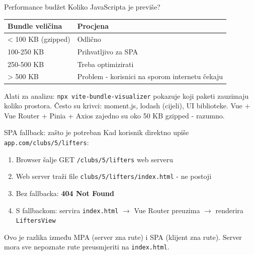 \begin{frame}{Performance budžet}
Koliko JavaScripta je previše?

\vspace{0.4em}
\begin{tabular}{@{}ll@{}}
  \toprule
  \textbf{Bundle veličina} & \textbf{Procjena} \\
  \midrule
  < 100 KB (gzipped) & Odlično \\
  100-250 KB & Prihvatljivo za SPA \\
  250-500 KB & Treba optimizirati \\
  > 500 KB & Problem - korisnici na sporom internetu čekaju \\
  \bottomrule
\end{tabular}

\vspace{0.6em}
Alati za analizu: \texttt{npx vite-bundle-visualizer} pokazuje koji paketi zauzimaju koliko prostora. Često su krivci: moment.js, lodash (cijeli), UI biblioteke. Vue + Vue Router + Pinia + Axios zajedno su oko 50 KB gzipped - razumno.
\end{frame}

\begin{frame}{SPA fallback: zašto je potreban}
Kad korisnik direktno upiše \texttt{app.com/clubs/5/lifters}:

\vspace{0.4em}
\begin{enumerate}
  \item Browser šalje GET \texttt{/clubs/5/lifters} web serveru
  \item Web server traži file \texttt{clubs/5/lifters/index.html} - ne postoji
  \item Bez fallbacka: \textbf{404 Not Found}
  \item S fallbackom: servira \texttt{index.html} $\rightarrow$ Vue Router preuzima $\rightarrow$ renderira \texttt{LiftersView}
\end{enumerate}

\vspace{0.6em}
Ovo je razlika između MPA (server zna rute) i SPA (klijent zna rute). Server mora sve nepoznate rute preusmjeriti na \texttt{index.html}.
\end{frame}

